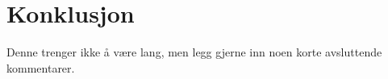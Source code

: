 \section{Konklusjon}\label{sec:konklusjon}
Denne trenger ikke å være lang, men legg gjerne inn noen korte avsluttende kommentarer.
